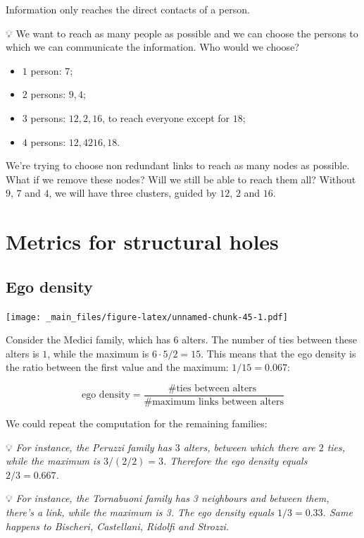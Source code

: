 \documentclass[
  notitlepage,
  onecolumn,
  openany]{book}
\providecommand{\tightlist}{%
  \setlength{\itemsep}{0pt}\setlength{\parskip}{0pt}}
\begin{document}
Information only reaches the direct contacts of a person.

💡 We want to reach as many people as possible and we can choose the persons to which we can communicate the information. Who would we choose?

\begin{itemize}
\tightlist
\item
  \(1\) person: \(7\);
\item
  \(2\) persons: \(9, 4\);
\item
  \(3\) persons: \(12, 2, 16\), to reach everyone except for \(18\);
\item
  \(4\) persons: \(12, 42 16, 18\).
\end{itemize}

We're trying to choose non redundant links to reach as many nodes as possible.
What if we remove these nodes? Will we still be able to reach them all? Without \(9\), \(7\) and \(4\), we will have three clusters, guided by \(12\), \(2\) and \(16\).

\hypertarget{metrics-for-structural-holes}{%
\chapter{Metrics for structural holes}\label{metrics-for-structural-holes}}

\hypertarget{ego-density}{%
\section{Ego density}\label{ego-density}}

\texttt{[image: \_main\_files/figure-latex/unnamed-chunk-45-1.pdf]}

Consider the Medici family, which has \(6\) alters. The number of ties between these alters is \(1\), while the maximum is \(6\cdot 5/2 = 15\). This means that the ego density is the ratio between the first value and the maximum: \(1/15 = 0.067\):

\[
\text{ego density} = \frac{ \text{\# ties between alters }}{\text{\# maximum links between alters}}
\]

We could repeat the computation for the remaining families:

💡 \emph{For instance, the Peruzzi family has \(3\) alters, between which there are \(2\) ties, while the maximum is \(3/(2/2) = 3\). Therefore the ego density equals \(2/3 = 0.667\).}

💡 \emph{For instance, the Tornabuoni family has 3 neighbours and between them, there's a link, while the maximum is 3. The ego density equals \(1/3 = 0.33\). Same happens to Bischeri, Castellani, Ridolfi and Strozzi.}
\end{document}
